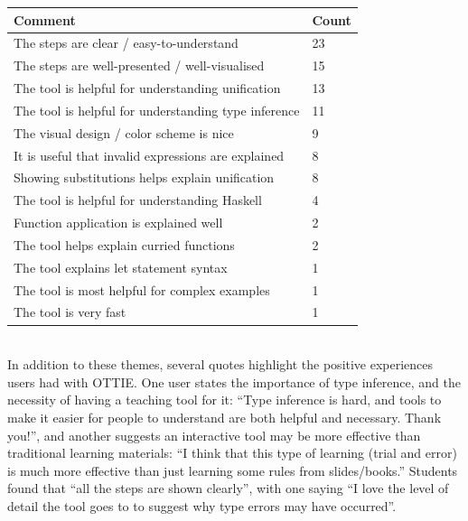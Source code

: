 \documentclass[a4paper,fleqn,oneside,12pt]{report}
\begin{document}
\vspace{0.2cm}
\begin{adjustbox}{center}
\begin{tabularx}{\textwidth}{ |X|p{1.5cm}| }
  \hline
  \textbf{Comment} & \textbf{Count} \\
  \hline
  The steps are clear / easy-to-understand & 23 \\
  \hline
  The steps are well-presented / well-visualised & 15 \\
  \hline
  The tool is helpful for understanding unification & 13 \\
  \hline
  The tool is helpful for understanding type inference & 11 \\
  \hline
  The visual design / color scheme is nice & 9 \\
  \hline
  It is useful that invalid expressions are explained & 8 \\
  \hline
  Showing substitutions helps explain unification & 8 \\
  \hline
  The tool is helpful for understanding Haskell & 4 \\
  \hline
  Function application is explained well & 2 \\
  \hline
  The tool helps explain curried functions & 2 \\
  \hline
  The tool explains let statement syntax & 1 \\
  \hline
  The tool is most helpful for complex examples & 1 \\
  \hline
  The tool is very fast & 1 \\
  \hline
\end{tabularx}
\end{adjustbox}\\

In addition to these themes, several quotes highlight the positive experiences users had with OTTIE. One user states the importance of type inference, and the necessity of having a teaching tool for it: “Type inference is hard, and tools to make it easier for people to understand are both helpful and necessary. Thank you!”, and another suggests an interactive tool may be more effective than traditional learning materials: “I think that this type of learning (trial and error) is much more effective than just learning some rules from slides/books.” Students found that “all the steps are shown clearly”, with one saying “I love the level of detail the tool goes to to suggest why type errors may have occurred”.
\end{document}
